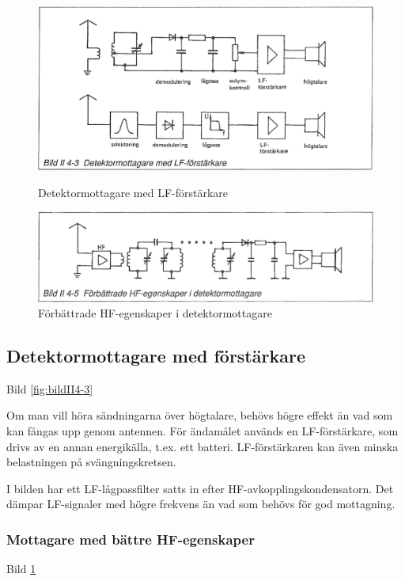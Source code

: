 \begin{figure}
  \includegraphics[width=\textwidth]{images/bild_2_4-03}
  \caption{Detektormottagare med LF-förstärkare}
  \label{fig:bildII4-3}

  \includegraphics[width=\textwidth]{images/bild_2_4-05}
  \caption{Förbättrade HF-egenskaper i detektormottagare}
  \label{fig:bildII4-5}
\end{figure}

\subsection{Detektormottagare med förstärkare}

Bild \ref{fig:bildII4-3}

Om man vill höra sändningarna över högtalare, behövs högre effekt än
vad som kan fångas upp genom antennen. För ändamålet används en
LF-förstärkare, som drivs av en annan energikälla, t.ex. ett
batteri. LF-förstärkaren kan även minska belastningen på
svängningskretsen.

I bilden har ett LF-lågpassfilter satts in efter
HF-avkopplingskondensatorn. Det dämpar LF-signaler med högre frekvens
än vad som behövs för god mottagning.

\subsubsection{Mottagare med bättre HF-egenskaper}

Bild \ref{fig:bildII4-5}

